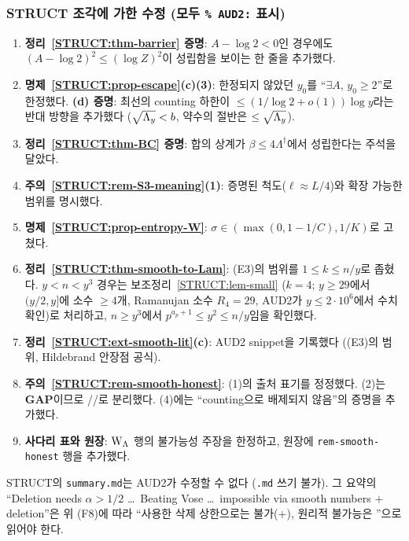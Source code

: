 \subsubsection{STRUCT 조각에 가한 수정 (모두 \texttt{\% AUD2:} 표시)}
\label{AUD2:fixes}
\begin{enumerate}[label=(F\arabic*)]
\item \textbf{정리~\ref{STRUCT:thm-barrier} 증명}: $A-\log2<0$인 경우에도 $(A-\log2)^2\le(\log Z)^2$이 성립함을 보이는 한 줄을 추가했다.
\item \textbf{명제~\ref{STRUCT:prop-escape}(c)(3)}: 한정되지 않았던 $y_0$를 ``$\exists A,\,y_0\ge2$''로 한정했다. \textbf{(d) 증명}: 최선의 counting 하한이 $\le(1/\log2+o(1))\log y$라는 반대 방향을 추가했다 ($\sqrt{\Lambda_y}<b$, 약수의 절반은 $\le\sqrt{\Lambda_y}$).
\item \textbf{정리~\ref{STRUCT:thm-BC} 증명}: 합의 상계가 $\beta\le4\Lambda^\dagger$에서 성립한다는 주석을 달았다.
\item \textbf{주의~\ref{STRUCT:rem-S3-meaning}(1)}: 증명된 척도($\ell\approx L/4$)와 확장 가능한 범위를 명시했다.
\item \textbf{명제~\ref{STRUCT:prop-entropy-W}}: $\sigma\in(\max(0,1-1/C),1/K)$로 고쳤다.
\item \textbf{정리~\ref{STRUCT:thm-smooth-to-Lam}}: (E3)의 범위를 $1\le k\le n/y$로 좁혔다. $y<n<y^3$ 경우는 보조정리~\ref{STRUCT:lem-small} ($k=4$; $y\ge29$에서 $(y/2,y]$에 소수 $\ge4$개, Ramanujan 소수 $R_4=29$, AUD2가 $y\le2\cdot10^6$에서 수치 확인)로 처리하고, $n\ge y^3$에서 $p^{a_p+1}\le y^2\le n/y$임을 확인했다.
\item \textbf{정리~\ref{STRUCT:ext-smooth-lit}(c)}: AUD2 snippet을 기록했다 ((E3)의 범위, Hildebrand 안장점 공식).
\item \textbf{주의~\ref{STRUCT:rem-smooth-honest}}: (1)의 출처 표기를 정정했다. (2)는 \textbf{GAP}이므로 \PROVED/\EXT/\HEUR{}로 분리했다. (4)에는 ``counting으로 배제되지 않음''의 증명을 추가했다.
\item \textbf{사다리 표와 원장}: $\mathrm W_\Lambda$ 행의 불가능성 주장을 한정하고, 원장에 \texttt{rem-smooth-honest} 행을 추가했다.
\end{enumerate}
STRUCT의 \texttt{summary.md}는 AUD2가 수정할 수 없다 (\texttt{.md} 쓰기 불가). 그 요약의 ``Deletion needs $\alpha>1/2$ \ldots\ Beating Vose \ldots\ impossible via smooth numbers $+$ deletion''은 위 (F8)에 따라 ``사용한 삭제 상한으로는 불가(\PROVED$+$\EXT), 원리적 불가능은 \HEUR''으로 읽어야 한다.

